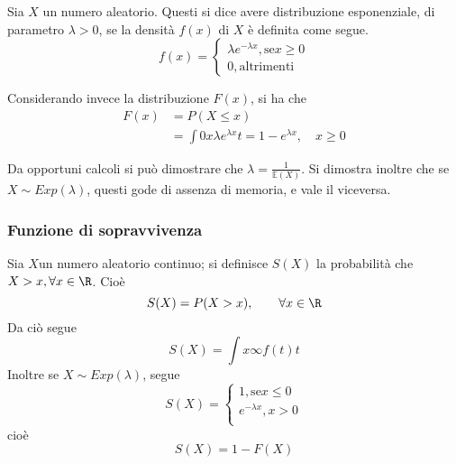 \documentclass{subfiles}
\begin{document}
Sia \(X\) un numero aleatorio. Questi si dice avere distribuzione esponenziale, di parametro \(\lambda > 0\), se la densità \(f(x)\) di \(X\) è definita come segue.
\[f(x) = \begin{cases}
        \lambda e^{-\lambda x}, \text{se} x \ge 0 \\
        0, \text{altrimenti}
    \end{cases}\]

Considerando invece la distribuzione \(F(x)\), si ha che
\[\begin{aligned}
        F(x) & = P(X \le x)                                                              \\
             & = \int{0}{x}{\lambda e^{\lambda x}}{t} = 1 - e^{\lambda x}, \quad x \ge 0
    \end{aligned}\]

\begin{Note*}
    Da opportuni calcoli si può dimostrare che \(\lambda = \tfrac{1}{\mathbb{E}(X)}\).
    Si dimostra inoltre che se \(X \sim Exp(\lambda)\), questi gode di assenza di memoria, e vale il viceversa.
\end{Note*}

\subsubsection{Funzione di sopravvivenza}
Sia \(X\)un numero aleatorio continuo; si definisce \(S(X)\) la probabilità che \(X > x, \forall x \in \R\). Cioè
\[
    S(X) = P(X > x), \qquad \forall x \in \R
\]
Da ciò segue
\[
    S(X) = \int{x}{\infty}{f(t)}{t}
\]
Inoltre se \(X \sim Exp(\lambda)\), segue
\[S(X) = \begin{cases}
        1, \text{se} x \le 0  \\
        e^{-\lambda x}, x > 0 \\
    \end{cases}\]
cioè
\[
    S(X) = 1 - F(X)
\]
\clearpage
\end{document}
